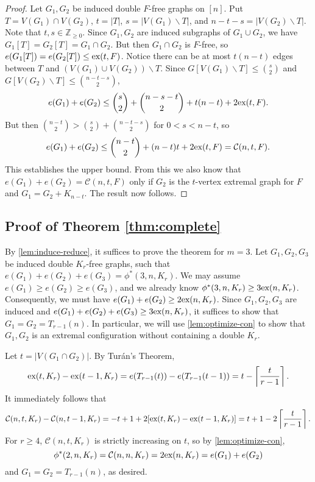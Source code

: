\documentclass[12pt]{article}
\newcommand*{\Z}{\mathbb{Z}}
\newcommand*{\ex}{\textnormal{ex}}
\newcommand*{\con}{\mathcal{C}}
\begin{document}
\begin{proof}
  Let $G_1, G_2$ be induced double $F$-free graphs on $[n]$. Put $T = V(G_1) \cap V(G_2)$, $t = |T|$, $s = |V(G_1) \backslash T|$, and $n - t - s = |V(G_2) \backslash T|$. Note that $t, s \in \Z_{\geq 0}$. Since $G_1, G_2$ are induced subgraphs of $G_1 \cup G_2$, we have $G_1[T] = G_2[T] = G_1 \cap G_2$. But then $G_1 \cap G_2$ is $F$-free, so $e(G_1[T]) = e(G_2[T]) \leq \ex(t, F)$. Notice there can be at most $t(n - t)$ edges between $T$ and $(V(G_1) \cup V(G_2)) \backslash T$. Since $G[V(G_1) \backslash T] \leq \binom{s}{2}$ and $G[V(G_2) \backslash T] \leq \binom{n - t - s}{2}$,
  \[
    e(G_1) + e(G_2) \leq \binom{s}{2} + \binom{n - s - t}{2} + t(n - t) + 2\ex(t, F).
  \]
  But then $\binom{n - t}{2} > \binom{s}{2} + \binom{n - t - s}{2}$ for $0 < s < n - t$, so
  \[
    e(G_1) + e(G_2) \leq \binom{n - t}{2} + (n - t)t + 2\ex(t, F) = \con(n, t, F).
  \]
  This establishes the upper bound. From this we also know that $e(G_1) + e(G_2) = \con(n, t, F)$ only if $G_2$ is the $t$-vertex extremal graph for $F$ and $G_1 = G_2 + K_{n - t}$. The result now follows.
\end{proof}

\subsection{Proof of Theorem \ref{thm:complete}}

By \cref{lem:induce-reduce}, it suffices to prove the theorem for $m = 3$. Let $G_1, G_2, G_3$ be induced double $K_r$-free graphs, such that $e(G_1) + e(G_2) + e(G_3) = \phi^*(3, n, K_r)$. We may assume $e(G_1) \geq e(G_2) \geq e(G_3)$, and we already know $\phi^*(3, n, K_r) \geq 3\ex(n, K_r)$. Consequently, we must have $e(G_1) + e(G_2) \geq 2\ex(n, K_r)$. Since $G_1, G_2, G_3$ are induced and $e(G_1) + e(G_2) + e(G_3) \geq 3\ex(n, K_r)$, it suffices to show that $G_1 = G_2 = T_{r - 1}(n)$. In particular, we will use \cref{lem:optimize-con} to show that $G_1, G_2$ is an extremal configuration without containing a double $K_r$. 

Let $t = |V(G_1 \cap G_2)|$. By Turán's Theorem,
\[
  \ex(t, K_{r}) - \ex(t - 1, K_{r}) = e(T_{r - 1}(t)) - e(T_{r - 1}(t - 1)) = t - \left\lceil \frac{t}{r - 1} \right\rceil.
\]
It immediately follows that
\begin{equation}
  \con(n, t, K_r) - \con(n, t - 1, K_r) = - t + 1 + 2[\ex(t, K_r) - \ex(t - 1, K_r)] = t + 1 - 2\left\lceil \frac{t}{r - 1} \right\rceil. \label{eq:con1}
\end{equation}
For $r \geq 4$, $\con(n, t, K_r)$ is strictly increasing on $t$, so by \cref{lem:optimize-con}, 
\[
  \phi^*(2, n, K_r) = \con(n, n, K_r) = 2\ex(n, K_r) = e(G_1) + e(G_2)
\]
and $G_1 = G_2 = T_{r - 1}(n)$, as desired. 
\end{document}
